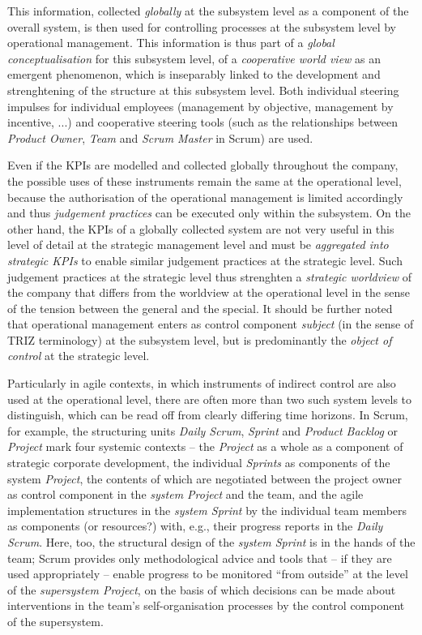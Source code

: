 \documentclass[11pt,a4paper]{article}
\begin{document}
This information, collected \emph{globally} at the subsystem level as a
component of the overall system, is then used for controlling processes at the
subsystem level by operational management. This information is thus part of a
\emph{global conceptualisation} for this subsystem level, of a
\emph{cooperative world view} as an emergent phenomenon, which is inseparably
linked to the development and strenghtening of the structure at this subsystem
level.  Both individual steering impulses for individual employees (management
by objective, management by incentive, ...) and cooperative steering tools
(such as the relationships between \emph{Product Owner}, \emph{Team} and
\emph{Scrum Master} in Scrum) are used.

Even if the KPIs are modelled and collected globally throughout the company,
the possible uses of these instruments remain the same at the operational
level, because the authorisation of the operational management is limited
accordingly and thus \emph{judgement practices} can be executed only within
the subsystem. On the other hand, the KPIs of a globally collected system are
not very useful in this level of detail at the strategic management level and
must be \emph{aggregated into strategic KPIs} to enable similar judgement
practices at the strategic level. Such judgement practices at the strategic
level thus strenghten a \emph{strategic worldview} of the company that differs
from the worldview at the operational level in the sense of the tension
between the general and the special. It should be further noted that
operational management enters as control component \emph{subject} (in the
sense of TRIZ terminology) at the subsystem level, but is predominantly the
\emph{object of control} at the strategic level.

Particularly in agile contexts, in which instruments of indirect control are
also used at the operational level, there are often more than two such system
levels to distinguish, which can be read off from clearly differing time
horizons.  In Scrum, for example, the structuring units \emph{Daily Scrum},
\emph{Sprint} and \emph{Product Backlog} or \emph{Project} mark four systemic
contexts -- the \emph{Project} as a whole as a component of strategic
corporate development, the individual \emph{Sprints} as components of the
system \emph{Project}, the contents of which are negotiated between the
project owner as control component in the \emph{system Project} and the team,
and the agile implementation structures in the \emph{system Sprint} by the
individual team members as components (or resources?) with, e.g., their
progress reports in the \emph{Daily Scrum}. Here, too, the structural design
of the \emph{system Sprint} is in the hands of the team; Scrum provides only
methodological advice and tools that -- if they are used appropriately --
enable progress to be monitored \enquote{from outside} at the level of the
\emph{supersystem Project}, on the basis of which decisions can be made about
interventions in the team's self-organisation processes by the control
component of the supersystem.
\end{document}
